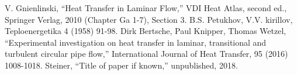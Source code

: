 \documentclass[conference]{IEEEtran}
\begin{document}
%
%
%
%

\begin{thebibliography}{00}
  V. Gnienlinski, ``Heat Transfer in Laminar Flow,'' VDI Heat Atlas, second ed., Springer Verlag, 2010 (Chapter Ga 1-7), Section 3.
  B.S. Petukhov, V.V. kirillov, Teploenergetika 4 (1958) 91-98.
  Dirk Bertsche, Paul Knipper, Thomas Wetzel, ``Experimental investigation on heat transfer in laminar, transitional and turbulent circular pipe flow,'' International Journal of Heat Transfer, 95 (2016) 1008-1018.
 Steiner, ``Title of paper if known,'' unpublished, 2018.

%
%

\end{thebibliography}
\end{document}
